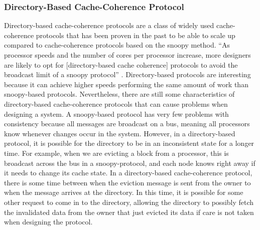 \documentclass[letterpaper]{article}
\begin{document}
\subsubsection{Directory-Based Cache-Coherence Protocol}
Directory-based cache-coherence protocols are a class of widely used cache-coherence protocols that has been proven in the past to be able to scale up compared to cache-coherence protocols based on the snoopy method. ``As processor speeds and the number of cores per processor increase, more designers are likely to opt for [directory-based cache coherence] protocols to avoid the broadcast limit of a snoopy protocol'' \cite{HEN00}. Directory-based protocols are interesting because it can achieve higher speeds performing the same amount of work than snoopy-based protocols. Nevertheless, there are still some characteristics of directory-based cache-coherence protocols that can cause problems when designing a system. A snoopy-based protocol has very few problems with consistency because all messages are broadcast on a bus, meaning all processors know whenever changes occur in the system. However, in a directory-based protocol, it is possible for the directory to be in an inconsistent state for a longer time. For example, when we are evicting a block from a processor, this is broadcast across the bus in a snoopy-protocol, and each node knows right away if it needs to change its cache state. In a directory-based cache-coherence protocol, there is some time between when the eviction message is sent from the owner to when the message arrives at the directory. In this time, it is possible for some other request to come in to the directory, allowing the directory to possibly fetch the invalidated data from the owner that just evicted its data if care is not taken when designing the protocol.
\end{document}
